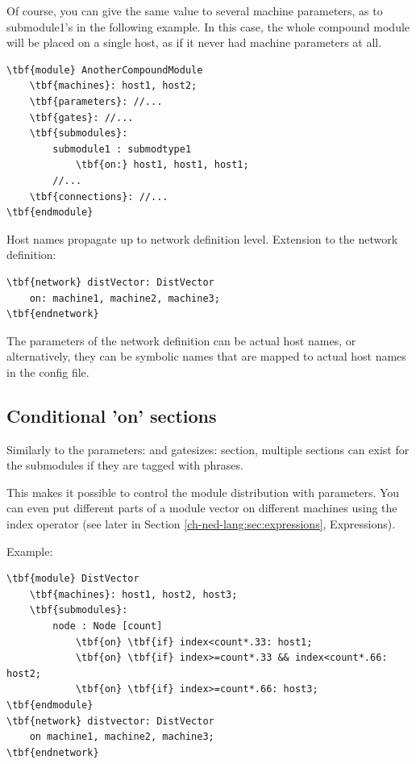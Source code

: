 Of course, you can give the same value to several machine parameters,
as to submodule1's in the following example. In this case, the whole
compound module will be placed on a single host, as if it never had
machine parameters at all.


\begin{Verbatim}[commandchars=\\\{\}]
\tbf{module} AnotherCompoundModule
    \tbf{machines}: host1, host2;
    \tbf{parameters}: //...
    \tbf{gates}: //...
    \tbf{submodules}:
        submodule1 : submodtype1
            \tbf{on:} host1, host1, host1;
        //...
    \tbf{connections}: //...
\tbf{endmodule}
\end{Verbatim}


Host names propagate up to network definition level. Extension
to the network definition:


\begin{Verbatim}[commandchars=\\\{\}]
\tbf{network} distVector: DistVector
    on: machine1, machine2, machine3;
\tbf{endnetwork}
\end{Verbatim}



The  parameters of the network definition
can be actual host names, or alternatively, they can be symbolic names
that are mapped to actual host names in the config file.





\subsection{Conditional 'on' sections}

Similarly to the parameters: and gatesizes: section, multiple
 sections can exist for the submodules if
they are tagged with  phrases.

This makes it possible to control the module distribution with
parameters. You can even put different parts of a module vector on
different machines using the index operator (see
later in Section \ref{ch-ned-lang:sec:expressions}, Expressions).

Example:


\begin{Verbatim}[commandchars=\\\{\}]
\tbf{module} DistVector
    \tbf{machines}: host1, host2, host3;
    \tbf{submodules}:
        node : Node [count]
            \tbf{on} \tbf{if} index<count*.33: host1;
            \tbf{on} \tbf{if} index>=count*.33 && index<count*.66: host2;
            \tbf{on} \tbf{if} index>=count*.66: host3;
\tbf{endmodule}
\tbf{network} distvector: DistVector
    on machine1, machine2, machine3;
\tbf{endnetwork}
\end{Verbatim}






